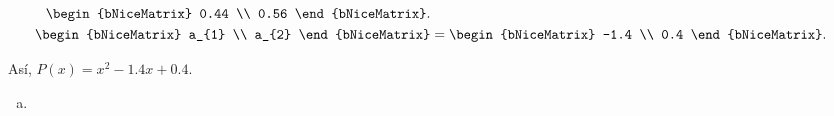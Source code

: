 \begin{frame}
\begin{solution}
\begin{enumerate}[c)]
\begin{equation*}
\begin{aligned}
\begin{bNiceMatrix}
						      0.44 \\
						      0.56
					      \end{bNiceMatrix}.    \\
					      \begin{bNiceMatrix}
						      a_{1} \\
						      a_{2}
					      \end{bNiceMatrix} & =
					      \begin{bNiceMatrix}
						      -1.4 \\
						      0.4
					      \end{bNiceMatrix}.
				      \end{aligned}
			      \end{equation*}

			      Así,
			      \begin{math}
				      P\left(x\right)=
				      x^{2}-1.4x+0.4
			      \end{math}.
		\end{enumerate}

		\begin{enumerate}[d)]
			\item


\end{enumerate}
\end{solution}
\end{frame}
